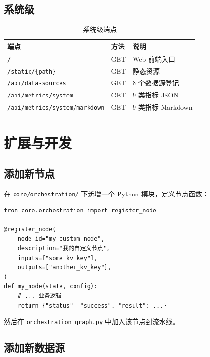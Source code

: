 \documentclass[11pt,a4paper]{article}
\begin{document}
\subsection{系统级}

\begin{table}[h]
\centering
\small
\caption{系统级端点}
\begin{tabular}{@{}p{7cm}p{2.5cm}p{4.5cm}@{}}
\toprule
\textbf{端点} & \textbf{方法} & \textbf{说明} \\
\midrule
\texttt{/} & GET & Web 前端入口 \\
\texttt{/static/\{path\}} & GET & 静态资源 \\
\texttt{/api/data-sources} & GET & 8 个数据源登记 \\
\texttt{/api/metrics/system} & GET & 9 类指标 JSON \\
\texttt{/api/metrics/system/markdown} & GET & 9 类指标 Markdown \\
\bottomrule
\end{tabular}
\end{table}

\section{扩展与开发}

\subsection{添加新节点}

在 \texttt{core/orchestration/} 下新增一个 Python 模块，定义节点函数：

\begin{verbatim}
from core.orchestration import register_node

@register_node(
    node_id="my_custom_node",
    description="我的自定义节点",
    inputs=["some_kv_key"],
    outputs=["another_kv_key"],
)
def my_node(state, config):
    # ... 业务逻辑
    return {"status": "success", "result": ...}
\end{verbatim}

然后在 \texttt{orchestration\_graph.py} 中加入该节点到流水线。

\subsection{添加新数据源}
\end{document}
